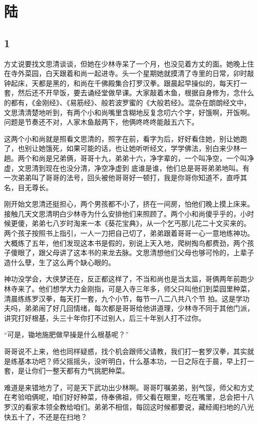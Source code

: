 \section{陆}

{\centering\subsection{1}}

方丈说要找文思清谈谈，但她在少林寺呆了一个月，也没见着方丈的面。她晚上住在寺外菜园，白天跟着和尚一起进寺。头一个星期她就摸清了寺里的日常，卯时敲钟起床，天都是黑的，和尚在千佛殿集合打罗汉拳。跟晨起早操似的，每天打一套，然后还不开早饭，要去诵经堂做早课。大家敲着木鱼，根据自身修为，念什么的都有，《金刚经》、《易筋经》、般若波罗蜜的《大般若经》。混杂在朗朗经文中，文思清清楚地听到，有两个小和尚嘴里含糊地反复念叨六个字，好饿啊，开饭啊。问题是节奏还不对，人家木鱼敲两下，他俩咚咚咚能敲五六下。

这两个小和尚就是照看文思清的，照字在前，看字为后，好好看住她，别让她跑了，也别让她饿死，如果可能的话，也让她听听经文，学学佛法，别白来少林一趟。两个和尚是兄弟俩，哥哥十九，弟弟十六，净字辈的，一个叫净空，一个叫净虚，文思清到现在也没分清，净空净虚到
底谁是谁，他们总是哥哥弟弟地叫。有一次弟弟叫了哥哥的法号，回头被他哥哥好一顿打，我是你哥你知道不，直呼其名，目无尊长。

刚开始文思清还挺担心，两个男孩都不小了，挤在一间房，怕他们晚上摸上床来。接触几天文思清明白少林寺为什么安排他们来照顾了。两个小和尚傻乎乎的，小时候更傻，弟弟七八岁时淘来一本《葵花宝典》，从一个乞丐那儿花二十文买来的。两个孩子按照书上指引，一人一刀把自己切了，弟弟跟着哥哥一心一意地练神功。大概练了五年，他们发现这本书是假的，别说上天入地，爬树掏鸟都费劲，两个孩子傻眼了，跟父母讲了这本书的来龙去脉。文思清想他们父母也够可怜的，上辈子造什么孽，生了这么两个缺心眼的。

神功没学会，大侠梦还在，反正都这样了，不当和尚也是当太监，哥俩两年前跑少林寺来了。他们想学大力金刚指，可是入寺三年多，师父只叫他们到菜园里种菜，清晨练练罗汉拳，每天打一套，九个小节，每节一八二八共八个节
拍。这是学功夫吗，弟弟闹了好几回情绪，每次都是哥哥给他讲道理，少林寺不同于其他门派，讲究打好根基，头三十年你打不过别人，后三十年别人打不过你。

“可是，锄地施肥做早操是什么根基呢？”

哥哥说不上来，他也同样疑惑，找个机会跟师父请教，我们打一套罗汉拳，其实就是练基本功吧？师父摇摇头，没听明白，什么基本功，一日之际在于晨，早上打一套，是让你们一整天都有力气挑肥种菜。

难道是来错地方了，可是天下武功出少林啊。哥哥叮嘱弟弟，别气馁，师父和方丈在考验咱俩呢，咱们好好种菜，侍奉佛祖，师父看在眼里，吃在嘴里，总会把十八罗汉的看家本领全教给咱们。弟弟不相信，每回这时候都要说，藏经阁扫地的八光快五十了，不还是在扫地？

